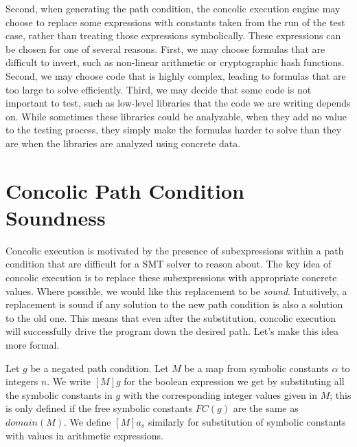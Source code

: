 \documentclass[11pt]{article}
\begin{document}
Second, when generating the path condition, the concolic execution engine may choose to replace some expressions with constants taken from the run of the test case, rather than treating those expressions symbolically.  These expressions can be chosen for one of several reasons.  First, we may choose formulas that are difficult to invert, such as non-linear arithmetic or cryptographic hash functions.  Second, we may choose code that is highly complex, leading to formulas that are too large to solve efficiently.  Third, we may decide that some code is not important to test, such as low-level libraries that the code we are writing depends on.  While sometimes these libraries could be analyzable, when they add no value to the testing process, they simply make the formulas harder to solve than they are when the libraries are analyzed using concrete data.





\section{Concolic Path Condition Soundness}

Concolic execution is motivated by the presence of subexpressions within a path
condition that are difficult for a SMT solver to reason about. The key idea of
concolic execution is to replace these subexpressions with appropriate concrete
values.
%
Where possible, we would like this replacement to be \emph{sound}. Intuitively,
a replacement is sound if any solution to the new path condition is also a
solution to the old one. This means that even after the substitution, concolic
execution will successfully drive the program down the desired path. Let's make
this idea more formal.

Let $g$ be a negated path condition. Let $M$ be a map from symbolic constants
$\alpha$ to integers $n$. We write $[M]g$ for the boolean expression we get by
substituting all the symbolic constants in $g$ with the corresponding integer
values given in $M$; this is only defined if the free symbolic constants $FC(g)$
are the same as $\textit{domain}(M)$. We define $[M]a_s$ similarly for
substitution of symbolic constants with values in arithmetic expressions.
\end{document}
